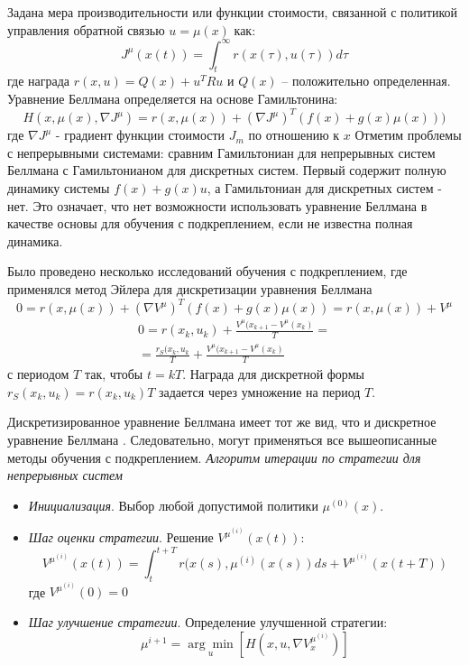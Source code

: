 Задана мера производительности или функции стоимости, связанной с политикой управления обратной связью $u = \mu(x)$ как:
\begin{equation*}
	J^{\mu}(x(t)) = \int_t^\infty{r(x(\tau),u(\tau))d\tau}
\end{equation*}
где награда $r(x,u) = Q(x) + u^TRu$ и $Q(x)$ -- положительно определенная.
Уравнение Беллмана определяется на основе Гамильтонина:
\begin{equation*}
\label{f:hamiltonianC}
H(x, \mu(x), \nabla J^{\mu}) = r(x, \mu(x)) + (\nabla J^{\mu})^T (f(x)+g(x) \mu(x)))
\end{equation*}
где $\nabla J^{\mu}$ -  градиент функции стоимости $J_m$ по отношению к $x$
Отметим проблемы с непрерывными системами: сравним Гамильтониан для непрерывных систем Беллмана с Гамильтонианом для дискретных систем. Первый содержит полную динамику системы $f(x) + g(x)u$, а Гамильтониан для дискретных систем - нет. Это означает, что нет возможности использовать уравнение Беллмана в качестве основы для обучения с подкреплением, если не известна полная динамика.

Было проведено несколько исследований обучения с подкреплением, где применялся метод Эйлера для дискретизации уравнения Беллмана
\begin{equation*}
0 = r(x,\mu(x)) + (\nabla V^{\mu})^T(f(x) + g(x)\mu(x)) = r(x, \mu(x))+V^{\mu}
\end{equation*}
%
\begin{gather*}
	0 = r(x_k, u_k) + \frac{V^\mu(x_{k+1} - V^{\mu}(x_k)}{T} =\\
	= \frac{r_S(x_k, u_k}{T} + \frac{V^{\mu}(x_{k+1} - V^{\mu}(x_k)}{T}
\end{gather*}
с периодом $T$ так, чтобы $t = kT$. Награда для дискретной формы $r_S(x_k, u_k) = r(x_k, u_k)T$ задается  через умножение на период $T$.


Дискретизированное уравнение  Беллмана имеет тот же вид, что и дискретное уравнение Беллмана . Следовательно, могут применяться все вышеописанные методы обучения с подкреплением.
\textit{Алгоритм итерации по стратегии для непрерывных систем}
\begin{itemize}
	\item \textit{Инициализация}. Выбор любой допустимой политики $\mu ^(0)(x)$.
	\item \textit{Шаг оценки стратегии}. Решение $V^{\mu^(i)}(x(t))$:
	\begin{equation}
	V^{\mu^(i)}(x(t)) = \int_t^{t+T} r(x(s), \mu^(i)(x(s))ds + V^{\mu^(i)}(x(t+T))
	\end{equation}
	где $V^{\mu^(i)}(0) = 0$
	\item \textit{Шаг улучшение стратегии}. Определение улучшенной стратегии:
	\begin{equation*}
		\mu^{i+1} = \underset{u}{\arg\min}[H(x, u, \nabla V^{\mu^{(i)}}_x)]
	\end{equation*}
\end{itemize}

